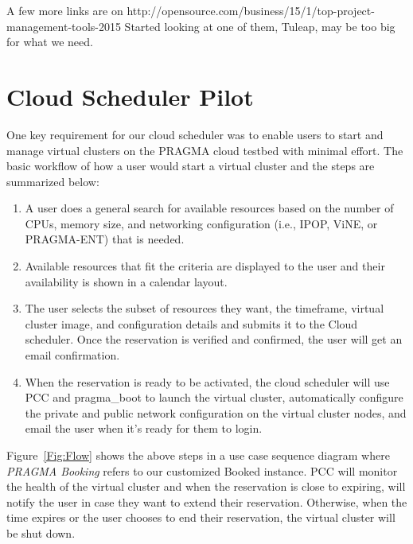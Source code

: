 \documentclass{acm_proc_article-sp}
\begin{document}
A few more links are on http://opensource.com/business/15/1/top-project-management-tools-2015
Started looking at  one of them, Tuleap, may be too big for what we need. 


\section{Cloud Scheduler Pilot}
\label{Sec:Pilot}

One key requirement for our cloud scheduler was to enable users to start and manage virtual clusters on the PRAGMA cloud testbed with minimal effort. 
The basic workflow of how a user would start a virtual cluster and the steps are summarized below:

\begin{enumerate}
\item A user does a general search for available resources based on the number of CPUs, memory size, and networking configuration (i.e., IPOP, ViNE, or PRAGMA-ENT) that is needed.  
\item Available resources that fit the criteria are displayed to the user and their availability is shown in a calendar layout.  
\item The user selects the subset of resources they want, the timeframe, virtual cluster image, and configuration details and submits it to the Cloud scheduler.  Once the reservation is verified and confirmed, the user will get an email confirmation.  
\item When the reservation is ready to be activated, the cloud scheduler will use PCC and pragma\_boot to launch the virtual cluster, automatically configure the private and public network configuration on the virtual cluster nodes, and email the user when it's ready for them to login.   
\end{enumerate}

Figure~\ref{Fig:Flow} shows the above steps in a use case sequence diagram where \textit{PRAGMA Booking} refers to our customized Booked instance.  PCC will monitor the health of the virtual cluster and when the reservation is close to expiring, will notify the user in case they want to extend their reservation.  Otherwise, when the time expires or the user chooses to end their reservation, the virtual cluster will be shut down.
\end{document}

